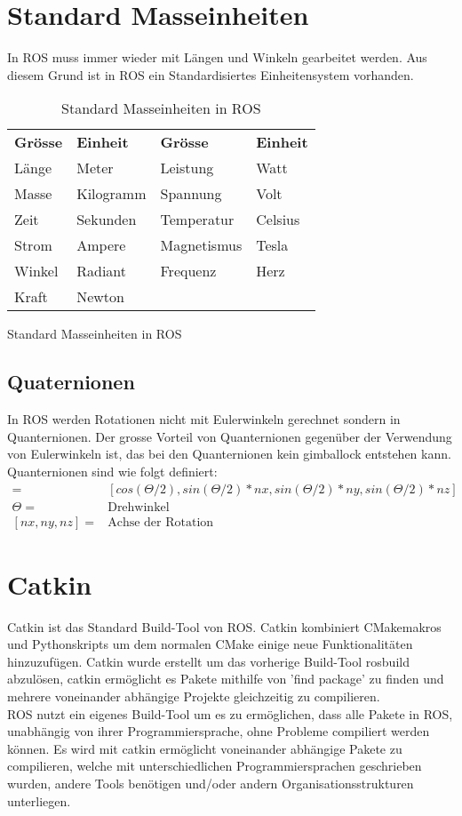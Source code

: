 \section{Standard Masseinheiten}
In ROS muss immer wieder mit Längen und Winkeln gearbeitet werden. Aus diesem Grund ist in ROS ein Standardisiertes Einheitensystem vorhanden. 
\begin{table}[h!]
\centering
\begin{tabular}{ll|ll}
\textbf{Grösse} & \textbf{Einheit} & \textbf{Grösse} & \textbf{Einheit} \\ \cline{1-3}
Länge           & Meter            & Leistung        & Watt             \\
Masse           & Kilogramm        & Spannung        & Volt             \\
Zeit            & Sekunden         & Temperatur      & Celsius          \\
Strom           & Ampere           & Magnetismus     & Tesla            \\
Winkel          & Radiant          & Frequenz        & Herz             \\
Kraft           & Newton           &                 &                 
\end{tabular}
\caption{Standard Masseinheiten in ROS}{Standard Masseinheiten in ROS\cite{REP103St88:online}}
\label{tab:StandardMasseinehiten}
\end{table}
\subsection{Quaternionen}
In ROS werden Rotationen nicht mit Eulerwinkeln gerechnet sondern in Quanternionen. Der grosse Vorteil von Quanternionen gegenüber der Verwendung von Eulerwinkeln ist, das bei den Quanternionen kein \gls{gimballock} entstehen kann. Quanternionen sind wie folgt definiert:
\begin{align*}
[w, x, y, z] =& [cos(\varTheta/2), sin(\varTheta/2) * nx, sin(\varTheta/2)* ny, sin(\varTheta/2) * nz]\\
\varTheta =& \text{Drehwinkel}\\
[nx,ny,nz] =& \text{Achse der Rotation}
\end{align*}

\section{Catkin}
Catkin ist das Standard Build-Tool von ROS. Catkin kombiniert CMakemakros und Pythonskripts um dem normalen CMake einige neue Funktionalitäten hinzuzufügen. Catkin wurde erstellt um das vorherige Build-Tool rosbuild abzulösen, catkin ermöglicht es Pakete mithilfe von 'find package' zu finden und mehrere voneinander abhängige Projekte gleichzeitig zu compilieren.\\
ROS nutzt ein eigenes Build-Tool um es zu ermöglichen, dass alle Pakete in ROS, unabhängig von ihrer Programmiersprache, ohne Probleme compiliert werden können. Es wird mit catkin ermöglicht voneinander abhängige Pakete zu compilieren, welche mit unterschiedlichen Programmiersprachen geschrieben wurden, andere Tools benötigen und/oder andern Organisationsstrukturen unterliegen. \cite{Allen2016}
